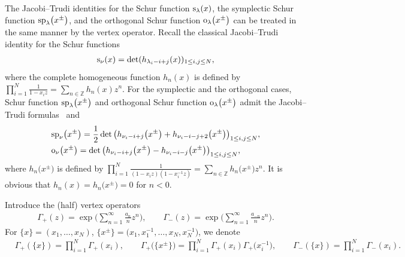 \documentclass[pdftex]{sigma}
\numberwithin{equation}{section}
\begin{document}
The Jacobi--Trudi identities for the Schur function ${\rm s}_\lambda(x)$, the symplectic Schur function ${\rm sp}_\lambda\big(x^{\pm}\big)$, and the orthogonal Schur function ${\rm o}_\lambda\big(x^{\pm}\big)$
can be treated in the same manner by the vertex operator. Recall the classical Jacobi--Trudi identity for the Schur functions~\cite[formula~(3.4)]{Mac1995}
\begin{align}\label{e:JT1}
{\rm s}_\nu(x)=\det(h_{\lambda_i-i+j}(x))_{1\leq i,j\leq N},
\end{align}
where the complete homogeneous function $h_n(x)$ is defined by $\prod^N_{i=1}\frac{1}{1-x_iz}=\sum_{n\in \mathbb{Z}}h_n(x)z^n$. For the symplectic and the orthogonal cases, Schur function ${\rm sp}_\lambda\big(x^{\pm}\big)$ and orthogonal Schur function ${\rm o}_\lambda\big(x^{\pm}\big)$ admit the Jacobi--Trudi formulas~\cite[Theorems~1.3.2 and~1.3.3]{KT1987} and \cite[formulas~(4.1) and~(4.2)]{JN2015}
\begin{align}
&\label{e:JT2}{\rm sp}_\nu\big(x^{\pm}\big)=\frac{1}{2}\det\big(h_{\nu_i-i+j}\big(x^{\pm}\big)+h_{\nu_{i}-i-j+2}\big(x^{\pm}\big)\big)_{1\leq i,j\leq N},\\
&\label{e:JT3}{\rm o}_\nu\big(x^{\pm}\big)=\det\big(h_{\nu_i-i+j}\big(x^{\pm}\big)-h_{\nu_{i}-i-j}\big(x^{\pm}\big)\big)_{1\leq i,j\leq N},
\end{align}
where $h_n\big(x^{\pm}\big)$ \cite{Ba1996,JN2015,Wey1946} is defined by $\prod^N_{i=1}\frac{1}{(1-x_iz)(1-x^{-1}_iz)}=\sum_{n\in \mathbb{Z}}h_n\big(x^{\pm}\big)z^n$. It is obvious that $h_n(x)=h_n\big(x^{\pm}\big)=0$ for $n<0$.

Introduce the (half) vertex operators
\begin{align}
\Gamma_+(z)=\exp\Biggl(\sum^\infty_{n=1}\frac{a_n}{n}z^n\Biggr), \qquad
\Gamma_-(z)=\exp\Biggl(\sum^\infty_{n=1}\frac{a_{-n}}{n}z^n\Biggr).\label{e:eq10}
\end{align}
For $\{x\}=(x_1,\dots,x_N)$, $\big\{x^{\pm}\big\}=\big(x_1,x^{-1}_1,\dots,x_N,x^{-1}_N\big)$, we denote
\begin{align*}
&\Gamma_+(\{x\})=\prod^{N}_{i=1}\Gamma_+(x_i),\qquad
\Gamma_+\big(\big\{x^{\pm}\big\}\big)=\prod^{N}_{i=1}\Gamma_+(x_i)\Gamma_+\big(x^{-1}_i\big),\qquad
\Gamma_-(\{x\})=\prod^{N}_{i=1}\Gamma_-(x_i).%
\end{align*}
\end{document}
